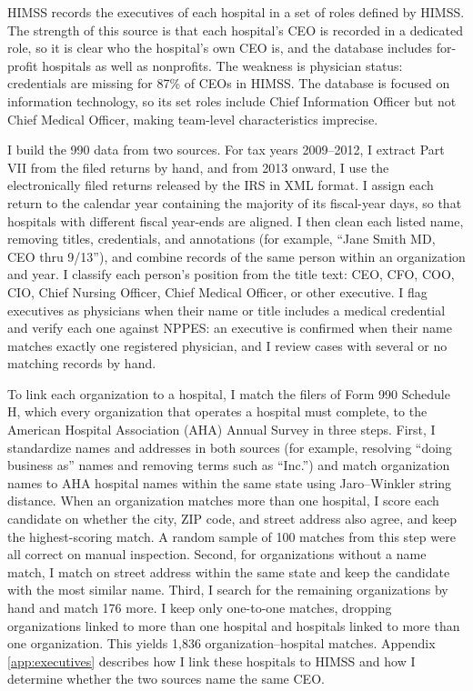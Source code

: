 \documentclass[12pt]{article}
\theoremstyle{definition}   %
\begin{document}
    HIMSS records the executives of each hospital in a set of roles defined by HIMSS. The strength of this source is that each hospital's CEO is recorded in a dedicated role, so it is clear who the hospital's own CEO is, and the database includes for-profit hospitals as well as nonprofits. The weakness is physician status: credentials are missing for 87\% of CEOs in HIMSS. The database is focused on information technology, so its set roles include Chief Information Officer but not Chief Medical Officer, making team-level characteristics imprecise.
 
    I build the 990 data from two sources. For tax years 2009--2012, I extract Part VII from the filed returns by hand, and from 2013 onward, I use the electronically filed returns released by the IRS in XML format. I assign each return to the calendar year containing the majority of its fiscal-year days, so that hospitals with different fiscal year-ends are aligned. I then clean each listed name, removing titles, credentials, and annotations (for example, ``Jane Smith MD, CEO thru 9/13''), and combine records of the same person within an organization and year. I classify each person's position from the title text: CEO, CFO, COO, CIO, Chief Nursing Officer, Chief Medical Officer, or other executive. I flag executives as physicians when their name or title includes a medical credential and verify each one against NPPES: an executive is confirmed when their name matches exactly one registered physician, and I review cases with several or no matching records by hand.
 
    To link each organization to a hospital, I match the filers of Form 990 Schedule H, which every organization that operates a hospital must complete, to the American Hospital Association (AHA) Annual Survey in three steps. First, I standardize names and addresses in both sources (for example, resolving ``doing business as'' names and removing terms such as ``Inc.'') and match organization names to AHA hospital names within the same state using Jaro--Winkler string distance. When an organization matches more than one hospital, I score each candidate on whether the city, ZIP code, and street address also agree, and keep the highest-scoring match. A random sample of 100 matches from this step were all correct on manual inspection. Second, for organizations without a name match, I match on street address within the same state and keep the candidate with the most similar name. Third, I search for the remaining organizations by hand and match 176 more. I keep only one-to-one matches, dropping organizations linked to more than one hospital and hospitals linked to more than one organization. This yields 1,836 organization--hospital matches. Appendix \ref{app:executives} describes how I link these hospitals to HIMSS and how I determine whether the two sources name the same CEO.
 
\end{document}
